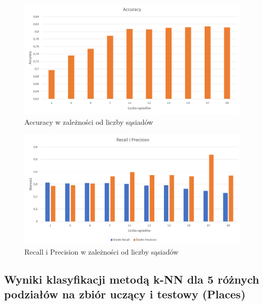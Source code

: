\documentclass{classrep}
\begin{document}
{\begin{figure}[H]
\caption{Accuracy w zależności od liczby sąsiadów}
\centering
\includegraphics[width=1\textwidth]{i1}
\end{figure}

\begin{figure}[H]
\caption{Recall i Precision w zależności od liczby sąsiadów}
\centering
\includegraphics[width=1\textwidth]{i2}
\end{figure}

\subsection{Wyniki klasyfikacji metodą k-NN dla 5 różnych podziałów na zbiór uczący i testowy (Places)}

}
\end{document}
